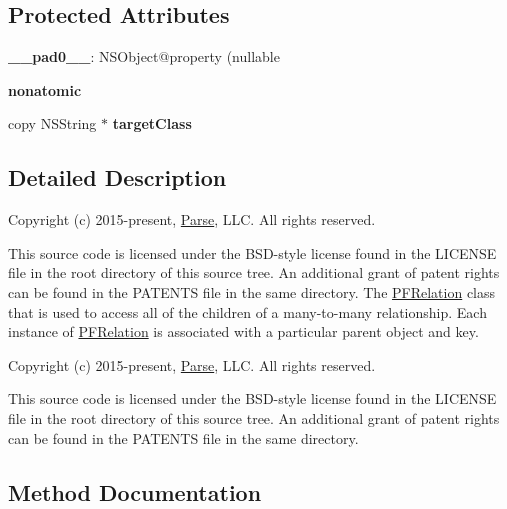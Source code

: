 \subsection*{Protected Attributes}
\begin{DoxyCompactItemize}
\item 
\hypertarget{interface_p_f_relation_a82a721e8b8f2e621997126e5ac59a340}{}{\bfseries \+\_\+\+\_\+pad0\+\_\+\+\_\+}\+: N\+S\+Object@property (nullable\label{interface_p_f_relation_a82a721e8b8f2e621997126e5ac59a340}

\item 
\hypertarget{interface_p_f_relation_a8b9b9863e7467327fd1c551eea8819a7}{}{\bfseries nonatomic}\label{interface_p_f_relation_a8b9b9863e7467327fd1c551eea8819a7}

\item 
\hypertarget{interface_p_f_relation_a2f9a38f347b5d5c3a6480902e9f19ef7}{}copy N\+S\+String $\ast$ {\bfseries target\+Class}\label{interface_p_f_relation_a2f9a38f347b5d5c3a6480902e9f19ef7}

\end{DoxyCompactItemize}


\subsection{Detailed Description}
Copyright (c) 2015-\/present, \hyperlink{interface_parse}{Parse}, L\+L\+C. All rights reserved.

This source code is licensed under the B\+S\+D-\/style license found in the L\+I\+C\+E\+N\+S\+E file in the root directory of this source tree. An additional grant of patent rights can be found in the P\+A\+T\+E\+N\+T\+S file in the same directory. The {\ttfamily \hyperlink{interface_p_f_relation}{P\+F\+Relation}} class that is used to access all of the children of a many-\/to-\/many relationship. Each instance of {\ttfamily \hyperlink{interface_p_f_relation}{P\+F\+Relation}} is associated with a particular parent object and key.

Copyright (c) 2015-\/present, \hyperlink{interface_parse}{Parse}, L\+L\+C. All rights reserved.

This source code is licensed under the B\+S\+D-\/style license found in the L\+I\+C\+E\+N\+S\+E file in the root directory of this source tree. An additional grant of patent rights can be found in the P\+A\+T\+E\+N\+T\+S file in the same directory. 

\subsection{Method Documentation}
\hypertarget{interface_p_f_relation_a28af311372ef3190483e82ca89599510}{}

